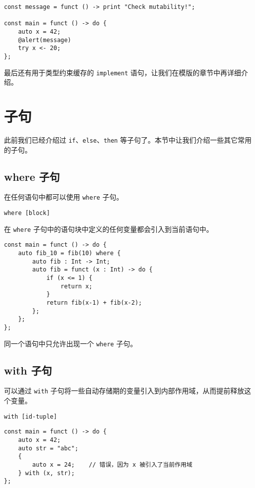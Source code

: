 \begin{lstlisting}
const message = funct () -> print "Check mutability!";

const main = funct () -> do {
    auto x = 42;
    @alert(message)
    try x <- 20;
};
\end{lstlisting}

最后还有用于类型约束缓存的 \lstinline!implement! 语句，让我们在模版的章节中再详细介绍。

\section{子句}

此前我们已经介绍过 \lstinline!if!、\lstinline!else!、\lstinline!then! 等子句了。本节中让我们介绍一些其它常用的子句。

\subsection{where 子句}

在任何语句中都可以使用 \lstinline!where! 子句。

\begin{grammar} \label{grm:where-clause}
    \lstinline!where [block]!
\end{grammar}

在 \lstinline!where! 子句中的语句块中定义的任何变量都会引入到当前语句中。

\begin{lstlisting}
const main = funct () -> do {
    auto fib_10 = fib(10) where {
        auto fib : Int -> Int;
        auto fib = funct (x : Int) -> do {
            if (x <= 1) {
                return x;
            }
            return fib(x-1) + fib(x-2);
        };
    };
};
\end{lstlisting}

同一个语句中只允许出现一个 \lstinline!where! 子句。

\subsection{with 子句}

可以通过 \lstinline!with! 子句将一些自动存储期的变量引入到内部作用域，从而提前释放这个变量。

\begin{grammar} \label{grm:with-clause}
    \lstinline!with [id-tuple]!
\end{grammar}

\begin{lstlisting}
const main = funct () -> do {
    auto x = 42;
    auto str = "abc";
    {
        auto x = 24;    // 错误，因为 x 被引入了当前作用域
    } with (x, str);
};
\end{lstlisting}

